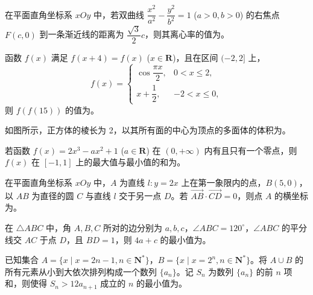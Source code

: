 \begin{question}
在平面直角坐标系 $xOy$ 中，若双曲线 $\dfrac{x^2}{a^2} - \dfrac{y^2}{b^2} = 1$ ($a > 0, b > 0$) 的右焦点 $F(c, 0)$ 到一条渐近线的距离为 $\dfrac{\sqrt{3}}{2}c$，则其离心率的值为\gkblank{}。

\end{question}
\begin{question}
函数 $f(x)$ 满足 $f(x + 4) = f(x)$ ($x \in \mathbf{R}$)，且在区间 $(-2, 2]$ 上，
\nopagebreak[4]
\[f(x) = \begin{cases} \cos\dfrac{\pi x}{2}, & 0 < x \leqslant 2, \\ x + \dfrac{1}{2}, & -2 < x \leqslant 0, \end{cases}\]
则 $f(f(15))$ 的值为\gkblank{}。

\Needspace{0.4\textheight}
\end{question}
\begin{question}
如图所示，正方体的棱长为 2，以其所有面的中心为顶点的多面体的体积为\gkblank{}。
\nopagebreak[4]
\begin{center}\end{center}
\nopagebreak[4]
\end{question}
\begin{question}
若函数 $f(x) = 2x^3 - ax^2 + 1$ ($a \in \mathbf{R}$) 在 $(0, +\infty)$ 内有且只有一个零点，则 $f(x)$ 在 $[-1, 1]$ 上的最大值与最小值的和为\gkblank{}。

\end{question}
\begin{question}
在平面直角坐标系 $xOy$ 中，$A$ 为直线 $l: y = 2x$ 上在第一象限内的点，$B(5, 0)$，以 $AB$ 为直径的圆 $C$ 与直线 $l$ 交于另一点 $D$。若 $\overrightarrow{AB} \cdot \overrightarrow{CD} = 0$，则点 $A$ 的横坐标为\gkblank{}。

\end{question}
\begin{question}
在 $\triangle ABC$ 中，角 $A, B, C$ 所对的边分别为 $a, b, c$，$\angle ABC = 120^\circ$，$\angle ABC$ 的平分线交 $AC$ 于点 $D$，且 $BD = 1$，则 $4a + c$ 的最小值为\gkblank{}。

\end{question}
\begin{question}
已知集合 $A = \{x \mid x = 2n - 1, n \in \mathbf{N}^*\}$，$B = \{x \mid x = 2^n, n \in \mathbf{N}^*\}$。将 $A \cup B$ 的所有元素从小到大依次排列构成一个数列 $\{a_n\}$。记 $S_n$ 为数列 $\{a_n\}$ 的前 $n$ 项和，则使得 $S_n > 12a_{n+1}$ 成立的 $n$ 的最小值为\gkblank{}。

\end{question}

